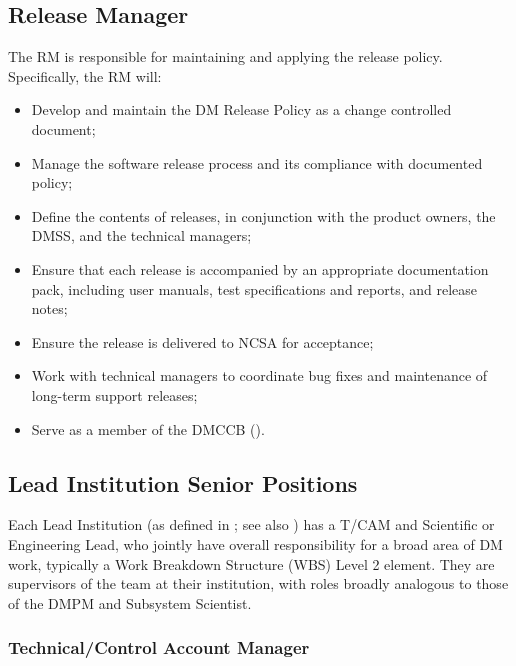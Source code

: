 \subsection{Release Manager}\label{role:dmrm}

The \gls{RM} is responsible for maintaining and applying the release policy.
Specifically, the \gls{RM} will:

\begin{itemize}

  \item{Develop and maintain the \gls{DM} \gls{Release} Policy as a change controlled
  document;}
  \item{Manage the software release process and its compliance with documented
  policy;}
  \item{Define the contents of releases, in conjunction with the product
  owners, the \gls{DMSS}, and the technical managers;}
  \item{Ensure that each release is accompanied by an appropriate
  documentation pack, including user manuals, test specifications and reports,
  and release notes;}
  \item{Ensure the release is delivered to \gls{NCSA} for acceptance;}
  \item{Work with technical managers to coordinate bug fixes and maintenance
  of long-term support releases;}
  \item{Serve as a member of the \gls{DMCCB} ().}

\end{itemize}

\subsection{Lead Institution Senior Positions}

Each Lead Institution (as defined in ; see also ) has a \gls{T/CAM} and Scientific or Engineering Lead, who jointly have overall responsibility for a broad area of \gls{DM} work, typically a \gls{Work Breakdown Structure} (\gls{WBS}) Level 2 element. They are supervisors of the team at their institution, with roles broadly analogous to those of the \gls{DMPM} and \gls{Subsystem Scientist}.

\subsubsection{Technical/Control Account Manager} \label{role:tcam}

